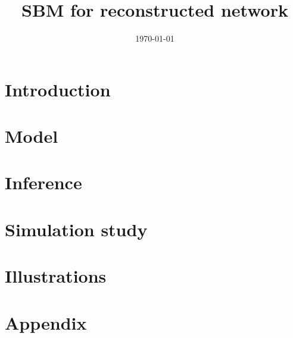 \documentclass[a4paper]{article}
\begin{document}
\title{SBM for reconstructed network}

\author{} 

\date{\today}
\maketitle

\tableofcontents

\newpage \section{Introduction}

\newpage \section{Model}


\newpage \section{Inference}


\newpage \section{Simulation study}


\newpage \section{Illustrations}





\appendix

\newpage \section{Appendix}


\end{document}
